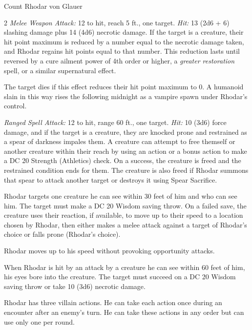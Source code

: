 \documentclass[10pt,a4paper,twoside,bg=print,twocolumn,openany,nodeprecatedcode]{dndbook}
\begin{document}
\begin{DndMonster}[float*=b,width=\textwidth + 8pt]{Count Rhodar von Glauer}
\begin{multicols}{2}
\textsl{Melee Weapon Attack:} 12 to hit, reach 5 ft., one target. \textsl{Hit:} 13 (2d6 + 6) slashing damage plus 14 (4d6) necrotic damage. If the target is a creature, their hit point maximum is reduced by a number equal to the necrotic damage taken, and Rhodar regains hit points equal to that number. This reduction lasts until reversed by a cure ailment power of 4th order or higher, a \textit{greater restoration} spell, or a similar supernatural effect.

The target dies if this effect reduces their hit point maximum to 0. A humanoid slain in this way rises the following midnight as a vampire spawn under Rhodar's control.

\textsl{Ranged Spell Attack:} 12 to hit, range 60 ft., one target. \textsl{Hit:} 10 (3d6) force damage, and if the target is a creature, they are knocked prone and restrained as a spear of darkness impales them. A creature can attempt to free themself or another creature within their reach by using an action or a bonus action to make a DC 20 Strength (Athletics) check. On a success, the creature is freed and the restrained condition ends for them. The creature is also freed if Rhodar summons that spear to attack another target or destroys it using Spear Sacrifice.

Rhodar targets one creature he can see within 30 feet of him and who can see him. The target must make a DC 20 Wisdom saving throw. On a failed save, the creature uses their reaction, if available, to move up to their speed to a location chosen by Rhodar, then either makes a melee attack against a target of Rhodar's choice or falls prone (Rhodar's choice).

Rhodar moves up to his speed without provoking opportunity attacks.

When Rhodar is hit by an attack by a creature he can see within 60 feet of him, his eyes bore into the creature. The target must succeed on a DC 20 Wisdom saving throw or take 10 (3d6) necrotic damage.

Rhodar has three villain actions. He can take each action once during an encounter after an enemy's turn. He can take these actions in any order but can use only one per round.


\end{multicols}
\end{DndMonster}
\end{document}
